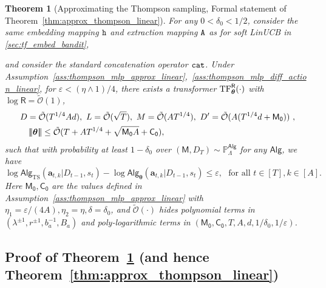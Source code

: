 \documentclass[10pt]{article}
\newtheorem{theorem}{Theorem}
\newcommand{\eps}{\varepsilon}
\newcommand{\<}{\left\langle}
\renewcommand{\>}{\right\rangle}
\newcommand{\TF}{{\rm TF}}
\newcommand{\nrmp}[1]{{\left|\!\left|\!\left|{#1}\right|\!\right|\!\right|}}
\renewcommand{\P}{\mathbb{P}}
\newcommand{\inst}{{\mathsf{M}}}
\newcommand{\TS}{{\mathrm{TS}}}
\newcommand{\Tpsparn}{{r}}
\newcommand{\trunprob}{{\eta_1}}
\newcommand{\Trunregpa}{{\eta_2}}
\newcommand{\Trunregp}{{\eta}}
\newcommand{\tcO}{{\tilde{\mathcal O}}}
\newcommand{\state}{{s}}
\newcommand{\totlen}{{T}}
\newcommand{\cat}{{\tt cat}}
\newcommand{\extractmap}{{\tt A}}
\newcommand{\embedmap}{{\tt h}}
\newcommand{\sAlg}{{\mathsf{Alg}}}
\newcommand{\dset}{{D}}
\newcommand{\prior}{{\Lambda}}
\newcommand{\tfpar}{{\btheta}}
\newcommand{\hidden}{{D'}}
\newcommand{\clipval}{{\mathsf{R}}}
\newcommand{\neuron}{{\mathsf{M_0}}}
\newcommand{\weightn}{{{\mathsf{C_0}}}}
\def\btheta{{\boldsymbol \theta}}
\def\ba{{\mathbf a}}
\begin{document}
\begin{theorem}[Approximating the Thompson sampling, Formal statement of Theorem~\ref{thm:approx_thompson_linear}]\label{thm:approx_thompson_linear-formal}
For any $0<\delta_0<1/2$, consider the same embedding mapping $\embedmap$ and extraction mapping $\extractmap$ as for soft LinUCB in \ref{sec:tf_embed_bandit},

and consider the standard concatenation operator $\cat$. Under Assumption~\ref{ass:thompson_mlp_approx_linear},~\ref{ass:thompson_mlp_diff_action_linear}, for $\eps<(\Trunregp\wedge1)/4$, there exists a  transformer $\TF_\btheta^{\clipval}(\cdot)$ with $\log \clipval = \tcO(1)$,
\begin{align}
&D=\tcO(T^{1/4}Ad),~L= \tcO(\sqrt{T}),~ M =\tcO(AT^{1/4}),~\hidden=\tcO(A(T^{1/4}d+\neuron))~,\notag\\
&~~~\nrmp{\btheta}\leq \tcO(T+AT^{1/4}+\sqrt{ \neuron A}+\weightn),\label{eq:ts_tf_param-formal}
\end{align}
such that with probability at least $1-\delta_0$ over $(\inst, \dset_{\totlen}) \sim \P_{\prior}^{\sAlg}$ for any $\sAlg$, we have
\[
\log \sAlg_{\TS}(\ba_{t,k}|\dset_{t-1},\state_t) - \log \sAlg_{\tfpar}(\ba_{t,k}|\dset_{t-1},\state_t) \leq \eps, ~~~ \text{for all } t\in[T],k\in[A].
\]
Here  $\neuron,\weightn$ are the values defined in   Assumption~\ref{ass:thompson_mlp_approx_linear} with $\trunprob=\eps/(4A),\Trunregpa=\Trunregp,\delta=\delta_0$, and $\tcO(\cdot)$ hides polynomial terms in $(\lambda^{\pm1},\Tpsparn^{\pm1},b_a^{-1},B_a)$ and poly-logarithmic terms in $(\neuron,\weightn,\totlen,A,d,1/\delta_0,1/\eps)$.
\end{theorem}






































\subsection{Proof of Theorem~\ref{thm:approx_thompson_linear-formal} (and hence Theorem~\ref{thm:approx_thompson_linear}) }\label{sec:pf_thm:approx_thompson_linear-formal}
\end{document}

